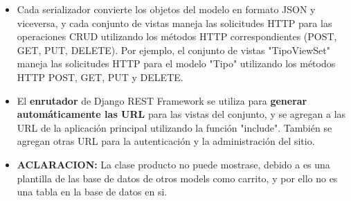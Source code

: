 \documentclass{article}
\begin{document}
\begin{itemize}
\begin{lstlisting}[language=python,caption={Desarrollo en la principal urls.py}][H]
    	\end{lstlisting}
        \item Cada serializador convierte los objetos del modelo en formato JSON y viceversa, y cada conjunto de vistas maneja las solicitudes HTTP para las operaciones CRUD utilizando los métodos HTTP correspondientes (POST, GET, PUT, DELETE). Por ejemplo, el conjunto de vistas "TipoViewSet" maneja las solicitudes HTTP para el modelo "Tipo" utilizando los métodos HTTP POST, GET, PUT y DELETE.
        \item El \textbf{enrutador} de Django REST Framework se utiliza para \textbf{generar automáticamente las URL} para las vistas del conjunto, y se agregan a las URL de la aplicación principal utilizando la función "include". También se agregan otras URL para la autenticación y la administración del sitio.
        \item \textbf{ACLARACION:} La clase producto no puede mostrase, debido a es una plantilla de las base de datos de otros models como carrito, y por ello no es una tabla en la base de datos en si.
        \end{itemize}
\end{document}
